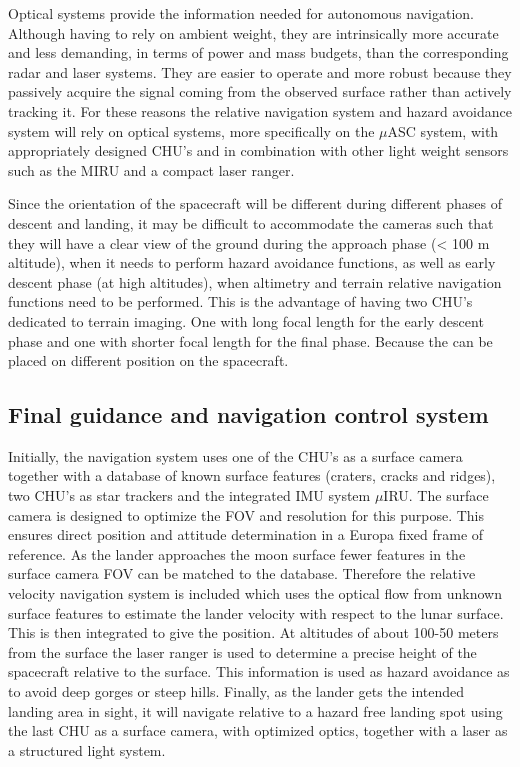 Optical systems provide the information needed for autonomous navigation. Although having to rely on ambient weight, they are intrinsically more accurate and less demanding, in terms of power and mass budgets, than the corresponding radar and laser systems. They are easier to operate and more robust because they passively acquire the signal coming from the observed surface rather than actively tracking it. For these reasons the relative navigation system and hazard avoidance system will rely on optical systems, more specifically on the $\mu$ASC system, with appropriately designed CHU's and in combination with other light weight sensors such as the MIRU and a compact laser ranger.

Since the orientation of the spacecraft will be different during different phases of descent and landing, it may be difficult to accommodate the cameras such that they will have a clear view of the ground during the approach phase (< 100 m altitude), when it needs to perform hazard avoidance functions, as well as early descent phase (at high altitudes), when altimetry and terrain relative navigation functions need to be performed. This is the advantage of having two CHU's dedicated to terrain imaging. One with long focal length for the early descent phase and one with shorter focal length for the final phase. Because the can be placed on different position on the spacecraft.

 
\subsection{Final guidance and navigation control system}
Initially, the navigation system uses one of the CHU's as a surface camera together with a database of known surface
features (craters, cracks and ridges), two CHU's as star trackers and the integrated IMU system $\mu$IRU. The surface camera is designed to optimize the FOV and resolution for this purpose. This ensures direct position and attitude determination in a Europa fixed frame of reference.
As the lander approaches the moon surface fewer features in the surface camera FOV
can be matched to the database. Therefore the relative velocity navigation system is included
which uses the optical flow from unknown surface features to estimate
the lander velocity with respect to the lunar surface. This is then integrated to give the
position. At altitudes of about 100-50 meters from the surface the laser ranger is used to determine a precise height of the spacecraft relative to the surface. This information is used as hazard avoidance as to avoid deep gorges or steep hills. Finally, as the lander gets the intended landing area in sight, it will navigate
relative to a hazard free landing spot using the last CHU as a surface camera, with optimized optics, together with a laser as a structured light system. 

